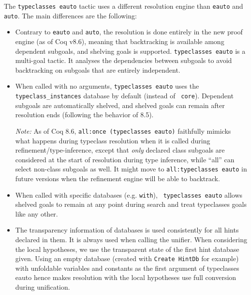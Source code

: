 The {\tt typeclasses eauto} tactic uses a different resolution engine
than {\tt eauto} and {\tt auto}. The main differences are the following:
\begin{itemize}
\item Contrary to {\tt eauto} and {\tt auto}, the resolution is done
  entirely in the new proof engine (as of Coq v8.6), meaning that
  backtracking is available among dependent subgoals, and shelving goals
  is supported. {\tt typeclasses eauto} is a multi-goal tactic.
  It analyses the dependencies between subgoals to avoid
  backtracking on subgoals that are entirely independent.
\item When called with no arguments, {\tt typeclasses eauto} uses the
  {\tt typeclass\_instances} database by default (instead of {\tt
    core}).
  Dependent subgoals are automatically shelved, and shelved
  goals can remain after resolution ends (following the behavior of
  \Coq{} 8.5).

  \emph{Note: } As of Coq 8.6, {\tt all:once (typeclasses eauto)}
  faithfully mimicks what happens during typeclass resolution when it is
  called during refinement/type-inference, except that \emph{only}
  declared class subgoals are considered at the start of resolution
  during type inference, while ``all'' can select non-class subgoals as
  well. It might move to {\tt all:typeclasses eauto} in future versions
  when the refinement engine will be able to backtrack.
\item When called with specific databases (e.g. {\tt with}), {\tt
    typeclasses eauto} allows shelved goals to remain at any point
  during search and treat typeclasses goals like any other.
\item The transparency information of databases is used consistently for
  all hints declared in them. It is always used when calling the unifier.
  When considering the local hypotheses, we use the transparent
  state of the first hint database given. Using an empty database
  (created with {\tt Create HintDb} for example) with 
  unfoldable variables and constants as the first argument of
  typeclasses eauto hence makes resolution with the local hypotheses use
  full conversion during unification.
\end{itemize}


